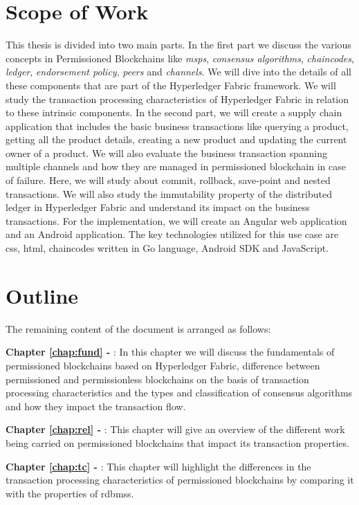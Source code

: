 \documentclass[
  a4paper,  %
  twoside,  %
  bibliography=totoc,
  headsepline,
  cleardoublepage=empty,
  parskip=half,
  draft=false
]{scrbook}
\begin{document}
\section{Scope of Work}
This thesis is divided into two main parts. In the first part we discuss the various concepts in Permissioned Blockchains like \textit{\glspl{msp}}, \textit{consensus algorithms}, \textit{chaincodes}, \textit{ledger}, \textit{endorsement policy}, \textit{peers} and \textit{channels}. We will dive into the details of all these components that are part of the Hyperledger Fabric framework. We will study the transaction processing characteristics of Hyperledger Fabric in relation to these intrinsic components. In the second part, we will create a supply chain application that includes the basic business transactions like querying a product, getting all the product details, creating a new product and updating the current owner of a product. We will also evaluate the business transaction spanning multiple channels and how they are managed in permissioned blockchain in case of failure. Here, we will study about commit, rollback, save-point and nested transactions. We will also study the immutability property of the distributed ledger in Hyperledger Fabric and understand its impact on the business transactions. For the implementation, we will create an Angular web application and an Android application. The key technologies utilized for this use case are \gls{css}, \gls{html}, chaincodes written in Go language, Android SDK and JavaScript.

\section{Outline}
The remaining content of the document is arranged as follows:

\textbf{Chapter \ref{chap:fund} - } : In this chapter we will discuss the fundamentals of permissioned blockchains based on Hyperledger Fabric, difference between permissioned and permissionless blockchains on the basis of transaction processing characteristics and the types and classification of consensus algorithms and how they impact the transaction flow.

\textbf{Chapter \ref{chap:rel} - } : This chapter will give an overview of the different work being carried on permissioned blockchains that impact its transaction properties.

\textbf{Chapter \ref{chap:tc} - } : This chapter will highlight the differences in the transaction processing characteristics of permissioned blockchains by comparing it with the properties of \glspl{rdbms}.
\end{document}
